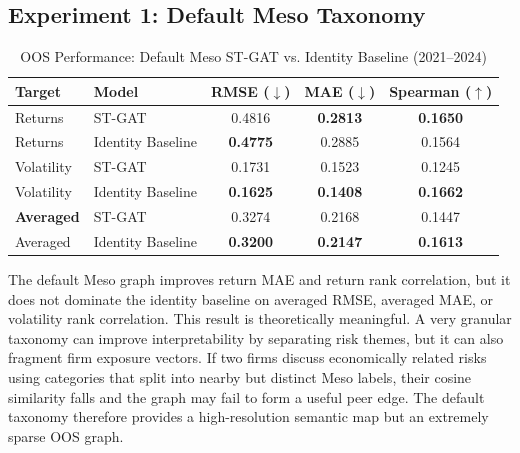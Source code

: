 \documentclass[11pt, a4paper]{article}
\begin{document}
\subsection{Experiment 1: Default Meso Taxonomy}
\begin{table}[H]
\centering
\caption{OOS Performance: Default Meso ST-GAT vs. Identity Baseline (2021--2024)}
\label{tab:default_meso_results}
\vspace{0.2cm}
\renewcommand{\arraystretch}{1.25}
\begin{tabular}{llccc}
\toprule
\textbf{Target} & \textbf{Model} & \textbf{RMSE} ($\downarrow$) & \textbf{MAE} ($\downarrow$) & \textbf{Spearman} ($\uparrow$) \\
\midrule
Returns & ST-GAT & 0.4816 & \textbf{0.2813} & \textbf{0.1650} \\
Returns & Identity Baseline & \textbf{0.4775} & 0.2885 & 0.1564 \\
\midrule
Volatility & ST-GAT & 0.1731 & 0.1523 & 0.1245 \\
Volatility & Identity Baseline & \textbf{0.1625} & \textbf{0.1408} & \textbf{0.1662} \\
\midrule
\textbf{Averaged} & ST-GAT & 0.3274 & 0.2168 & 0.1447 \\
Averaged & Identity Baseline & \textbf{0.3200} & \textbf{0.2147} & \textbf{0.1613} \\
\bottomrule
\end{tabular}
\end{table}

The default Meso graph improves return MAE and return rank correlation, but it does not dominate the identity baseline on averaged RMSE, averaged MAE, or volatility rank correlation. This result is theoretically meaningful. A very granular taxonomy can improve interpretability by separating risk themes, but it can also fragment firm exposure vectors. If two firms discuss economically related risks using categories that split into nearby but distinct Meso labels, their cosine similarity falls and the graph may fail to form a useful peer edge. The default taxonomy therefore provides a high-resolution semantic map but an extremely sparse OOS graph.
\end{document}
